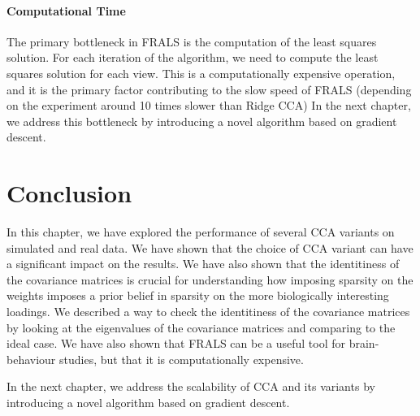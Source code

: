 \paragraph{Computational Time}\label{subsec:computational-time}

The primary bottleneck in FRALS is the computation of the least squares solution.
For each iteration of the algorithm, we need to compute the least squares solution for each view.
This is a computationally expensive operation, and it is the primary factor contributing to the slow speed of FRALS (depending on the experiment around 10 times slower than Ridge CCA)
In the next chapter, we address this bottleneck by introducing a novel algorithm based on gradient descent.

\section{Conclusion}\label{sec:conclusion}

In this chapter, we have explored the performance of several CCA variants on simulated and real data.
We have shown that the choice of CCA variant can have a significant impact on the results.
We have also shown that the identitiness of the covariance matrices is crucial for understanding how imposing sparsity on the weights imposes a prior belief in sparsity on the more biologically interesting loadings.
We described a way to check the identitiness of the covariance matrices by looking at the eigenvalues of the covariance matrices and comparing to the ideal case.
We have also shown that FRALS can be a useful tool for brain-behaviour studies, but that it is computationally expensive.

In the next chapter, we address the scalability of CCA and its variants by introducing a novel algorithm based on gradient descent.